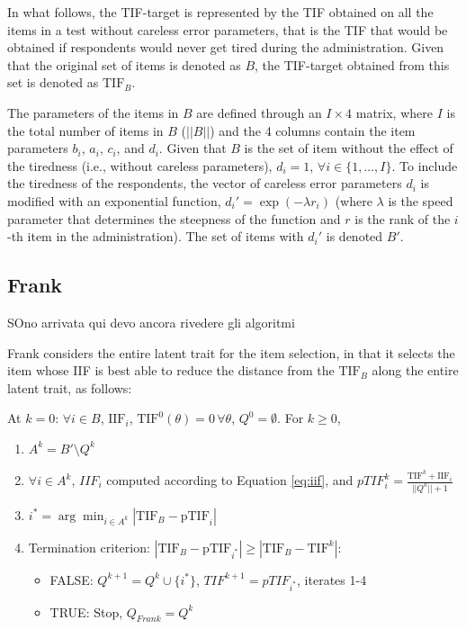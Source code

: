 \documentclass{svproc}
\begin{document}
In what follows, the TIF-target is represented by the TIF obtained on all the items in a test without careless error parameters, that is the TIF that would be obtained if respondents would never get tired during the administration. Given that the original set of items is denoted as $B$, the TIF-target obtained from this set is denoted as $\text{TIF}_B$.

The parameters of the items in $B$ are defined through an $I \times 4$ matrix, where $I$ is the total number of items in $B$ ($||B||$) and the 4 columns contain the item parameters $b_i$, $a_i$, $c_i$, and $d_i$. 
Given that $B$ is the set of item without the effect of the tiredness (i.e., without careless parameters), $d_i = 1$, $\forall i \in \{1, \ldots, I\}$. To include the tiredness of the respondents, the vector of careless error parameters $d_i$ is modified with an exponential function, $d_i' = \exp(-\lambda r_i)$ (where $\lambda$ is the speed parameter that determines the steepness of the function and $r$ is the rank of the $i$-th item in the administration).
The set of items with $d_i'$ is denoted $B'$.


\subsection{Frank}

\color{red}
SOno arrivata qui devo ancora rivedere gli algoritmi
\normalcolor

Frank considers the entire latent trait for the item selection, in that it selects the item whose IIF is best able to reduce the distance from the $\text{TIF}_B$ along the entire latent trait, as follows:


At $k = 0$: $\forall i \in B$, $\text{IIF}_i$, $\text{TIF}^0(\theta) = 0 \, \forall \theta$, $Q^0 = \emptyset$. For $k \geq 0$,

\begin{enumerate}
	\item  $A^k = B' \setminus Q^k$ 
		\color{red}
	\item $\forall i \in A^k$, $IIF_i$ computed according to Equation \ref{eq:iif}, and $pTIF_{i}^k = \frac{\text{TIF}^k + \text{IIF}_{i}}{||Q^k||+1}$
	\normalcolor
	\item $i^* = \arg \min_{i \in A^k} |\text{TIF}_B - \text{pTIF}_i|$
	\item Termination criterion: $|\text{TIF}_B - \text{pTIF}_{i^*}| \geq |\text{TIF}_B - \text{TIF}^{k}|$: 
	\begin{itemize}
		\item FALSE:  $Q^{k+1} = Q^{k} \cup \{i^*\}$, $TIF^{k+1} = pTIF_{i^*}$, iterates 1-4 
		\item TRUE: Stop, %
		$Q_{Frank} = Q^k$
		
	\end{itemize}
\end{enumerate}
\end{document}
